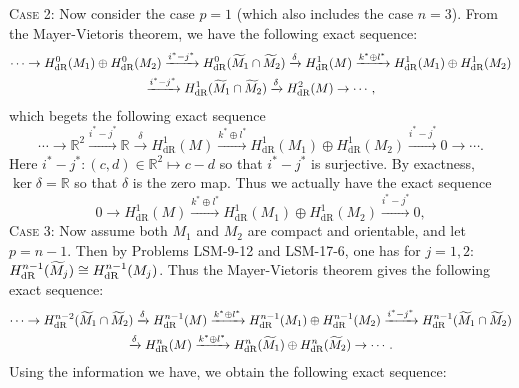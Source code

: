 \documentclass{article}
\begin{document}
	\textsc{Case 2:} Now consider the case $p = 1$ (which also includes the case $n= 3$). From the Mayer-Vietoris theorem, we have the following exact sequence: 
	\begin{multline*}
		\dotsm \to H^{0}_{\text{dR}}(M_{1}) \oplus H^{0}_{\text{dR}}(M_{2}) \xrightarrow{i^{\ast} - j^{\ast}}  H^{0}_{\text{dR}}(\widetilde{M}_{1} \cap \widetilde{M}_{2}) \xrightarrow{\delta} H^{1}_{\text{dR}}(M) \xrightarrow{k^{\ast} \oplus l^{\ast}} H^{1}_{\text{dR}}(M_{1}) \oplus H^{1}_{\text{dR}}(M_{2}) \\ \xrightarrow{i^{\ast} - j^{\ast}} H^{1}_{\text{dR}}(\widetilde{M}_{1} \cap \widetilde{M}_{2}) \xrightarrow{\delta} H^{2}_{\text{dR}}(M) \to \dotsm, 
	\end{multline*}
	which begets the following exact sequence 
	\begin{equation*}
		\dotsm \to  \mathbb{R}^{2} \xrightarrow{i^{\ast} - j^{\ast}} \mathbb{R} \xrightarrow{\delta} H^{1}_{\text{dR}}(M) \xrightarrow{k^{\ast} \oplus l^{\ast}} H^{1}_{\text{dR}}(M_{1}) \oplus H^{1}_{\text{dR}}(M_{2}) \xrightarrow{i^{\ast} - j^{\ast}} 0 \to \dotsm. 
	\end{equation*}
	Here $i^{\ast} - j^{\ast}: (c, d) \in \mathbb{R}^{2} \mapsto c - d$ so that $i^{\ast} - j^{\ast}$ is surjective. By exactness, $\ker{\delta} = \mathbb{R}$  so that $\delta$ is the zero map. Thus we actually have the exact sequence 
	\begin{equation*}
		0 \to H^{1}_{\text{dR}}(M) \xrightarrow{k^{\ast}\oplus l^{\ast}} H^{1}_{\text{dR}}(M_{1}) \oplus H^{1}_{\text{dR}}(M_{2}) \xrightarrow{i^{\ast} - j^{\ast}} 0, 
	\end{equation*}
	\textsc{Case 3:} Now assume both $M_{1}$ and $M_{2}$ are compact and orientable, and let $p = n -1$. Then by Problems LSM-9-12 and LSM-17-6, one has for $j = 1, 2$: $H^{n-1}_{\text{dR}}(\widetilde{M}_{j}) \cong H^{n-1}_{\text{dR}}(M_{j})$. Thus the Mayer-Vietoris theorem gives the following exact sequence:
	\begin{multline*}
		\dotsm \to H^{n-2}_{\text{dR}}(\widetilde{M}_{1} \cap \widetilde{M}_{2}) \xrightarrow{\delta} H^{n-1}_{\text{dR}}(M) \xrightarrow{k^{\ast} \oplus l^{\ast}} H^{n-1}_{\text{dR}}(M_{1}) \oplus H^{n-1}_{\text{dR}}(M_{2}) \xrightarrow{i^{\ast} - j^{\ast}} H^{n-1}_{\text{dR}}(\widetilde{M}_{1} \cap \widetilde{M}_{2}) \\ \xrightarrow{\delta} H^{n}_{\text{dR}}(M) \xrightarrow{k^\ast \oplus l^\ast}H^{n}_{\text{dR}}(\widetilde{M}_{1}) \oplus H^{n}_{\text{dR}}(\widetilde{M}_{2}) \to\dotsm. 
	\end{multline*}
	Using the information we have, we obtain the following exact sequence: 
\end{document}
